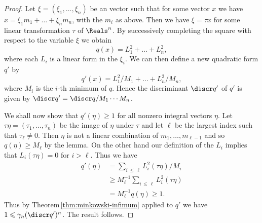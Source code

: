\begin{proof}
    Let \(\xi = (\xi_1, \dots, \xi_n)\) be an vector such that for some vector
    \(x\) we have \(x = \xi_1 m_1 + \dots + \xi_n m_n\), with the \(m_i\) as
    above. Then we have \(\xi = \tau x\) for some linear transformation \(\tau\)
    of \(\Reals^n\). By successively completing the square with respect to the
    variable \(\xi\) we obtain
    \[
        q(x) = L_1^2 + \dots + L_n^2,
    \]
    where each \(L_i\) is a linear form in the \(\xi_i\). We can then define a
    new quadratic form \(q'\) by
    \[
        q'(x) = L_1^2/M_1 + \dots + L_n^2/M_n,
    \]
    where \(M_i\) is the \(i\)-th minimum of \(q\). Hence the discriminant
    \(\discr q'\) of \(q'\) is given by \(\discr q' = \discr q/M_1 \cdots M_n\).

    We shall now show that \(q'(\eta) \geq 1\) for all nonzero integral vectors
    \(\eta\). Let \(\tau\eta = (\tau_1, \dots, \tau_n)\) be the image of
    \(\eta\) under \(\tau\) and let \(\ell\) be the largest index such that
    \(\tau_\ell \neq 0\). Then \(\eta\) is not a linear combination of \(m_1,
    \dots, m_{\ell-1}\) and so \(q(\eta) \geq M_\ell\) by the lemma. On the
    other hand our definition of the \(L_i\) implies that \(L_i(\tau\eta) = 0\)
    for \(i > \ell\). Thus we have
    \begin{align*}
        q'(\eta) &= \sum_{i\,\leq\,\ell} L^2_i(\tau\eta)/M_i \\ &\geq M_\ell^{-1} \sum_{i\,\leq\,\ell} L^2_i(\tau\eta)\\ &= M_\ell^{-1} q(\eta) \geq 1.
    \end{align*}
    Thus by Theorem\,\ref{thm:minkowski-infimum} applied to \(q'\) we have \(1
    \leq \gamma_n (\discr q')^n\). The result follows.
\end{proof}
